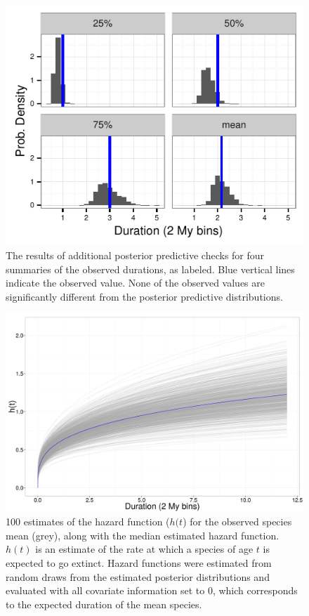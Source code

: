 \documentclass{article}
\begin{document}
\begin{figure}[ht]
  \centering
  \includegraphics[height = 0.5\textheight, width = \textwidth, keepaspectratio = true]{figure/quant_ppc}
  \caption{The results of additional posterior predictive checks for four summaries of the observed durations, as labeled. Blue vertical lines indicate the observed value. None of the observed values are significantly different from the posterior predictive distributions.}
  \label{fig:ppc_quant}
\end{figure}

\begin{figure}[ht]
  \centering
  \includegraphics[height = 0.5\textheight, width = \textwidth, keepaspectratio = true]{figure/haz_est}
  \caption{100 estimates of the hazard function (\(h(t\)) for the observed species mean (grey), along with the median estimated hazard function. \(h(t)\) is an estimate of the rate at which a species of age \(t\) is expected to go extinct. Hazard functions were estimated from random draws from the estimated posterior distributions and evaluated with all covariate information set to 0, which corresponds to the expected duration of the mean species.}
  \label{fig:haz}
\end{figure}
\end{document}
